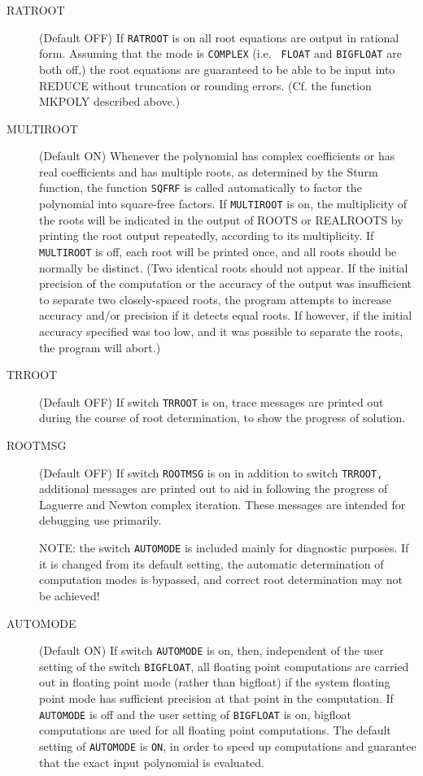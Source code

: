 \begin{description}
\item[RATROOT] (Default OFF) If {\tt RATROOT} is on all root equations are
output in rational form.  Assuming that the mode is {\tt COMPLEX} (i.e. {\tt
FLOAT} and {\tt BIGFLOAT} are both off,) the root equations are guaranteed to
be able to be input into REDUCE without truncation or rounding errors. (Cf.
the function MKPOLY described above.)

\item[MULTIROOT] (Default ON) Whenever the polynomial has complex
coefficients or has real coefficients and has multiple roots, as
 determined by the Sturm function, the function {\tt SQFRF} is
called automatically to factor the polynomial into square-free factors.  If
{\tt MULTIROOT} is on, the multiplicity of the roots will be indicated in the
output of ROOTS or REALROOTS by printing the root output repeatedly,
according to its multiplicity.  If {\tt MULTIROOT} is off, each root will be
printed once, and all roots should be normally be distinct. (Two identical
roots should not appear.  If the initial precision of the computation or the
accuracy of the output was insufficient to separate two closely-spaced roots,
the program attempts to increase accuracy and/or precision if it detects
equal roots.  If however, if the initial accuracy specified was too low, and
it was possible to separate the roots, the program will abort.)

\item[TRROOT] (Default OFF)  If switch {\tt TRROOT} is on, trace messages are
printed out during the course of root determination, to show the
progress of solution.
                  
\item[ROOTMSG] (Default OFF) If switch {\tt ROOTMSG} is on in addition to
switch {\tt TRROOT,} additional messages are printed out to aid in following
the progress of Laguerre and Newton complex iteration.  These messages are
intended for debugging use primarily.


NOTE: the switch {\tt AUTOMODE} is included mainly for diagnostic purposes.
If it is changed from its default setting, the automatic determination
of computation modes is bypassed, and correct root determination may not
be achieved!

\item[AUTOMODE] (Default ON) If switch {\tt AUTOMODE} is on, then,
independent of the user setting of the switch {\tt BIGFLOAT}, all floating
point computations are carried out in floating point mode (rather than
bigfloat) if the system floating point mode has sufficient precision at that
point in the computation.  If {\tt AUTOMODE} is off and the user setting of
{\tt BIGFLOAT} is on, bigfloat computations are used for all floating point
computations.  The default setting of {\tt AUTOMODE} is {\tt ON}, in order to
speed up computations and guarantee that the exact input polynomial is
evaluated. \end{description}


